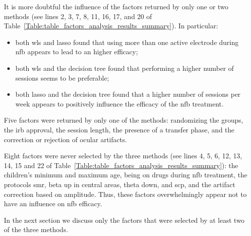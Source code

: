 It is more doubtful the influence of the factors returned by only one or two methods (see lines 2, 3, 7, 8, 11, 16, 17, and 20
of Table~\ref{Table:table_factors_analysis_results_summary}). In particular: 
\begin{itemize}
\item both \gls{wls} and \gls{lasso} found that using more than one active electrode during \gls{nfb} appears to lead to an higher efficacy;
\item both \gls{wls} and the decision tree found that performing a higher number of sessions seems to be preferable;
\item both \gls{lasso} and the decision tree found that a higher number of sessions per week appears to positively influence the efficacy of the \gls{nfb} treatment.
\end{itemize}
Five factors were returned by only one of the methods: randomizing the groups, the \gls{irb} approval, the session length, the presence of a transfer phase, 
and the correction or rejection of ocular artifacts.

Eight factors were never selected by the three methods (see lines 4, 5, 6, 12, 13, 14, 15 and 22 of 
Table~\ref{Table:table_factors_analysis_results_summary}): the children's minimum and maximum age, being on drugs during \gls{nfb} treatment,
the protocols \gls{smr}, beta up in central areas, theta down, and \gls{scp}, and the artifact correction based on amplitude.
Thus, these factors overwhelmingly appear not to have an influence on \gls{nfb} efficacy. 

In the next section we discuss only the factors that were selected by at least two of the three methods. 

